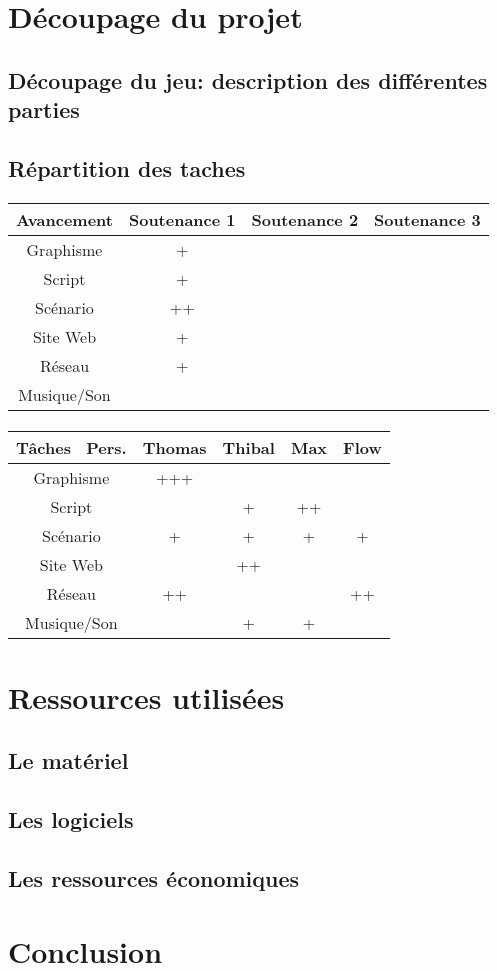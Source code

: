 \documentclass[12pt,a4paper]{article}
\begin{document}
\newpage
\section{Découpage du projet}
\subsection{Découpage du jeu: description des différentes parties}

\subsection{Répartition des taches}
\paragraph{}
\begin{tabular}{|c|c|c|c|}
\hline 
\rowcolor{cyan} Avancement & Soutenance 1 & Soutenance 2 & Soutenance 3 \\ 
\hline 
\cellcolor{lightgray}Graphisme & + &  &  \\ 
\hline 
\cellcolor{lightgray}Script & + &  &  \\ 
\hline 
\cellcolor{lightgray}Scénario & ++ &  &  \\ 
\hline 
\cellcolor{lightgray}Site Web & + &  &  \\ 
\hline
\cellcolor{lightgray}Réseau & + &  &  \\ 
\hline 
\cellcolor{lightgray}Musique/Son &  &  &  \\ 
\hline 
\end{tabular}
\paragraph{}
\begin{tabular}{|c|c|c|c|c|}
 \hline 
 \rowcolor{cyan}Tâches \ Pers. & Thomas & Thibal & Max & Flow \\ 
 \hline 
 \cellcolor{lightgray}Graphisme & +++ &  &  &  \\ 
 \hline 
 \cellcolor{lightgray}Script &  & + & ++ &  \\ 
 \hline 
 \cellcolor{lightgray}Scénario & + & + & + & + \\ 
 \hline 
 \cellcolor{lightgray}Site Web &  & ++ &  &  \\ 
 \hline 
 \cellcolor{lightgray} Réseau & ++ &  &  & ++ \\ 
 \hline 
 \cellcolor{lightgray}Musique/Son &  & + & + &  \\ 
 \hline 
 \end{tabular}  
\newpage
\section{Ressources utilisées}
\subsection{Le matériel}
\subsection{Les logiciels}
\subsection{Les ressources économiques}

\newpage
\section{Conclusion}	
\end{document}
